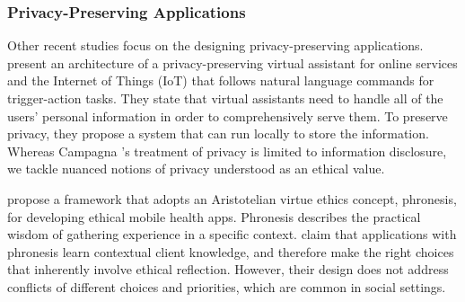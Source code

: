 \subsubsection{Privacy-Preserving Applications}

Other recent studies focus on the designing privacy-preserving applications. 
% 
\citet{Campagna-WWW2017-Almond} present an architecture of a privacy-preserving virtual assistant for online services and the Internet of Things (IoT) that follows natural language commands for trigger-action tasks. They state that virtual assistants need to handle all of the users' personal information in order to comprehensively serve them. To preserve privacy, they propose a system that can run locally to store the information. 
Whereas Campagna {\etal}'s  treatment of privacy is limited to information disclosure, we tackle nuanced notions of privacy understood as an ethical value.

\citet{Barry-CHI2017-EthicalDesign} propose a framework that adopts an Aristotelian virtue ethics concept, phronesis, for developing ethical mobile health apps. Phronesis describes the practical wisdom of gathering experience in a specific context. \citet{Barry-CHI2017-EthicalDesign} claim that applications with phronesis learn contextual client knowledge, and therefore make the right choices that inherently involve ethical reflection. However, their design does not address conflicts of different choices and priorities, which are common in social settings. 





